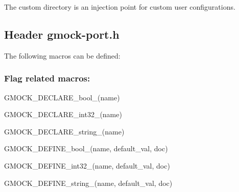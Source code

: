 The custom directory is an injection point for custom user configurations.

\subsection*{Header {\ttfamily gmock-\/port.\+h}}

The following macros can be defined\+:

\subsubsection*{Flag related macros\+:}


\begin{DoxyItemize}
\item {\ttfamily G\+M\+O\+C\+K\+\_\+\+D\+E\+C\+L\+A\+R\+E\+\_\+bool\+\_\+(name)}
\item {\ttfamily G\+M\+O\+C\+K\+\_\+\+D\+E\+C\+L\+A\+R\+E\+\_\+int32\+\_\+(name)}
\item {\ttfamily G\+M\+O\+C\+K\+\_\+\+D\+E\+C\+L\+A\+R\+E\+\_\+string\+\_\+(name)}
\item {\ttfamily G\+M\+O\+C\+K\+\_\+\+D\+E\+F\+I\+N\+E\+\_\+bool\+\_\+(name, default\+\_\+val, doc)}
\item {\ttfamily G\+M\+O\+C\+K\+\_\+\+D\+E\+F\+I\+N\+E\+\_\+int32\+\_\+(name, default\+\_\+val, doc)}
\item {\ttfamily G\+M\+O\+C\+K\+\_\+\+D\+E\+F\+I\+N\+E\+\_\+string\+\_\+(name, default\+\_\+val, doc)} 
\end{DoxyItemize}